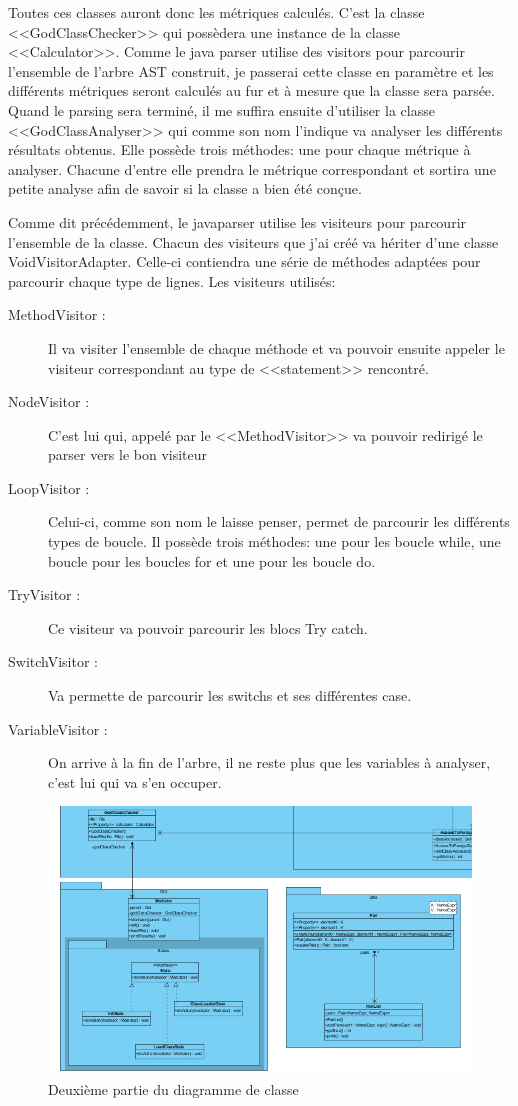 \documentclass[a4paper, 11pt]{article}
\begin{document}
	Toutes ces classes auront donc les métriques calculés. C'est la classe <<GodClassChecker>> qui possèdera une instance de la classe <<Calculator>>. Comme le java parser utilise des visitors pour parcourir l'ensemble de l'arbre AST construit, je passerai cette classe en paramètre et les différents métriques seront calculés au fur et à mesure que la classe sera parsée. Quand le parsing sera terminé, il me suffira ensuite d'utiliser la classe <<GodClassAnalyser>> qui comme son nom l'indique va analyser les différents résultats obtenus. Elle possède trois méthodes: une pour chaque métrique à analyser. Chacune d'entre elle prendra le métrique correspondant et sortira une petite analyse afin de savoir si la classe a bien été conçue.
	
	Comme dit précédemment, le javaparser utilise les visiteurs pour parcourir l'ensemble de la classe. Chacun des visiteurs que j'ai créé va hériter d'une classe VoidVisitorAdapter. Celle-ci contiendra une série de méthodes adaptées pour parcourir chaque type de lignes. Les visiteurs utilisés:
	\begin{description}
		\item[MethodVisitor :] Il va visiter l'ensemble de chaque méthode et va pouvoir ensuite appeler le visiteur correspondant au type de <<statement>> rencontré.
		\item[NodeVisitor :] C'est lui qui, appelé par le <<MethodVisitor>> va pouvoir redirigé le parser vers le bon visiteur
		\item[LoopVisitor :] Celui-ci, comme son nom le laisse penser, permet de parcourir les différents types de boucle. Il possède trois méthodes: une pour les boucle while, une boucle pour les boucles for et une pour les boucle do.
		\item[TryVisitor :] Ce visiteur va pouvoir parcourir les blocs Try catch.
		\item[SwitchVisitor :] Va permette de parcourir les switchs et ses différentes case.
		\item[VariableVisitor :] On arrive à la fin de l'arbre, il ne reste plus que les variables à analyser, c'est lui qui va s'en occuper.
	\end{description}
	
	\begin{figure}[!h]
		\centering
		\includegraphics[scale=0.8]{Images/ClassDiagram2.png}
		\caption{Deuxième partie du diagramme de classe}
		\label{diag2}
	\end{figure}
	
\end{document}
